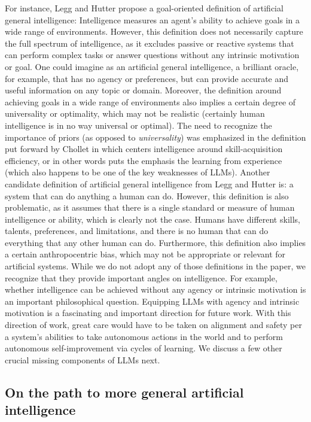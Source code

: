For instance, Legg and Hutter \cite{legg2008machine} propose a goal-oriented definition of artificial general intelligence: Intelligence measures an agent’s ability to achieve goals in a wide range of environments. However, this definition does not necessarily capture the full spectrum of intelligence, as it excludes passive or reactive systems that can perform complex tasks or answer questions without any intrinsic motivation or goal. One could imagine as an artificial general intelligence, a brilliant oracle, for example, that has no agency or preferences, but can provide accurate and useful information on any topic or domain. Moreover, the definition around achieving goals in a wide range of environments also implies a certain degree of universality or optimality, which may not be realistic (certainly human intelligence is in no way universal or optimal). The need to recognize the importance of priors (as opposed to {\em universality}) was emphasized in the definition put forward by Chollet in \cite{chollet2019measure} which centers intelligence around skill-acquisition efficiency, or in other words puts the emphasis the learning from experience (which also happens to be one of the key weaknesses of LLMs). Another candidate definition of artificial general intelligence from Legg and Hutter \cite{legg2007universal} is: a system that can do anything a human can do. However, this definition is also problematic, as it assumes that there is a single standard or measure of human intelligence or ability, which is clearly not the case. Humans have different skills, talents, preferences, and limitations, and there is no human that can do everything that any other human can do. Furthermore, this definition also implies a certain anthropocentric bias, which may not be appropriate or relevant for artificial systems. While we do not adopt any of those definitions in the paper, we recognize that they provide important angles on intelligence. For example, whether intelligence can be achieved without any agency or intrinsic motivation is an important philosophical question. Equipping LLMs with agency and intrinsic motivation is a fascinating and important direction for future work. With this direction of work, great care would have to be taken on alignment and safety per a system's abilities to take autonomous actions in the world and to perform autonomous self-improvement via cycles of learning. We discuss a few other crucial missing components of LLMs next.

\subsection{On the path to more general artificial intelligence}


